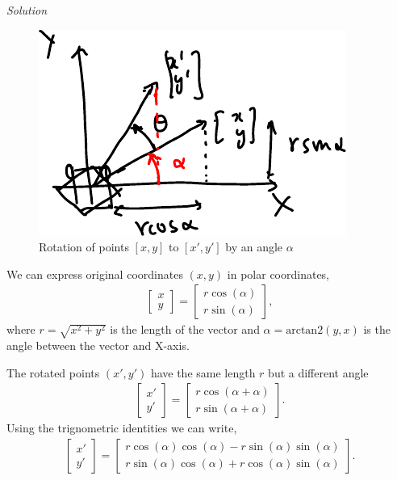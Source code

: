 \documentclass{article}
\numberwithin{prob}{section}
\newenvironment{solution}{\emph{Solution}}{}
\begin{document}
\begin{solution}


\begin{figure}
  \includegraphics[width=\linewidth]{media/rotation2D-diagram.pdf}
  \caption{Rotation of points $[x, y]$ to $[x', y']$ by an angle $\alpha$}
\end{figure}
We can express original coordinates $(x,y)$ in polar coordinates,
\begin{align}
  \begin{bmatrix}
    x \\ y 
  \end{bmatrix} 
  = \begin{bmatrix}
    r \cos(\alpha) \\ r \sin(\alpha)
  \end{bmatrix} ,
\end{align}
where $r = \sqrt{x^2 + y^2}$  is the length of the vector and $\alpha  = \text{arctan2}(y, x)$ is the angle between the vector and X-axis.

The rotated points $(x', y')$ have the same length $r$ but a different angle
\begin{align}
  \begin{bmatrix}
    x' \\ y'
  \end{bmatrix} 
  = \begin{bmatrix}
    r \cos(\alpha+\alpha) \\ r \sin(\alpha + \alpha)
  \end{bmatrix} .
\end{align}
Using the trignometric identities we can write,
\begin{align}
  \begin{bmatrix}
    x' \\ y'
  \end{bmatrix} 
  = \begin{bmatrix}
    r \cos(\alpha)\cos(\alpha)-r\sin(\alpha)\sin(\alpha) \\
    r \sin(\alpha)\cos(\alpha)+r\cos(\alpha)\sin(\alpha)
  \end{bmatrix}.
\end{align}


\end{solution}
\end{document}
